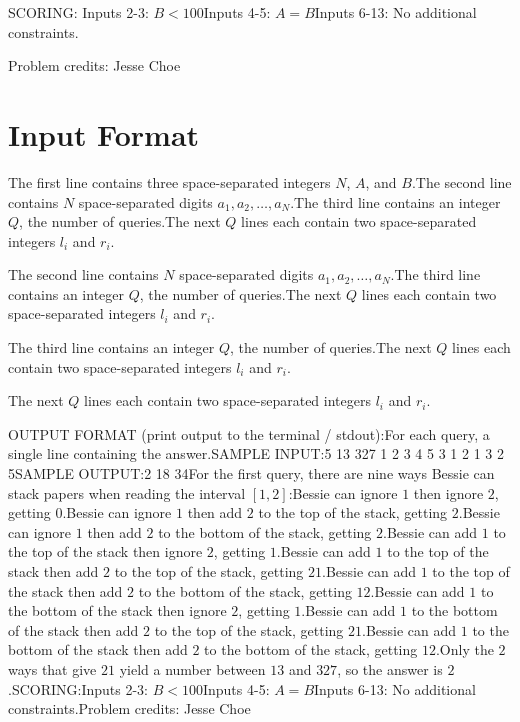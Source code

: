 \documentclass[12pt]{article}
\begin{document}
SCORING:
Inputs 2-3: $B<100$Inputs 4-5: $A=B$Inputs 6-13: No additional constraints.


Problem credits: Jesse Choe



\section*{Input Format}
The first line contains three space-separated integers $N$, $A$, and $B$.The second line contains $N$ space-separated digits $a_1, a_2, \dots, a_N$.The third line contains an integer $Q$, the number of queries.The next $Q$ lines each contain two space-separated integers $l_i$ and $r_i$.

The second line contains $N$ space-separated digits $a_1, a_2, \dots, a_N$.The third line contains an integer $Q$, the number of queries.The next $Q$ lines each contain two space-separated integers $l_i$ and $r_i$.

The third line contains an integer $Q$, the number of queries.The next $Q$ lines each contain two space-separated integers $l_i$ and $r_i$.

The next $Q$ lines each contain two space-separated integers $l_i$ and $r_i$.

OUTPUT FORMAT (print output to the terminal / stdout):For each query, a single line containing the answer.SAMPLE INPUT:5 13 327
1 2 3 4 5
3
1 2
1 3
2 5SAMPLE OUTPUT:2
18
34For the first query, there are nine ways Bessie can stack papers when reading
the interval $[1, 2]$:Bessie can ignore $1$ then ignore $2$, getting $0$.Bessie can
ignore $1$ then add $2$ to the top of the stack, getting $2$.Bessie
can ignore $1$ then add $2$ to the bottom of the stack, getting $2$.Bessie can add $1$ to the top of the stack then ignore $2$, getting $1$.Bessie can add $1$ to the top of the stack then add $2$ to the top of
the stack, getting $21$.Bessie can add $1$ to the top of the stack
then add $2$ to the bottom of the stack, getting $12$.Bessie
can add $1$ to the bottom of the stack then ignore $2$, getting $1$.Bessie can add $1$ to the bottom of the stack then add $2$ to the top of the
stack, getting $21$.Bessie can add $1$ to the bottom of the stack
then add $2$ to the bottom of the stack, getting $12$.Only the $2$ ways that give $21$ yield a number between $13$ and $327$, so the
answer is $2$.SCORING:Inputs 2-3: $B<100$Inputs 4-5: $A=B$Inputs 6-13: No additional constraints.Problem credits: Jesse Choe
\end{document}
